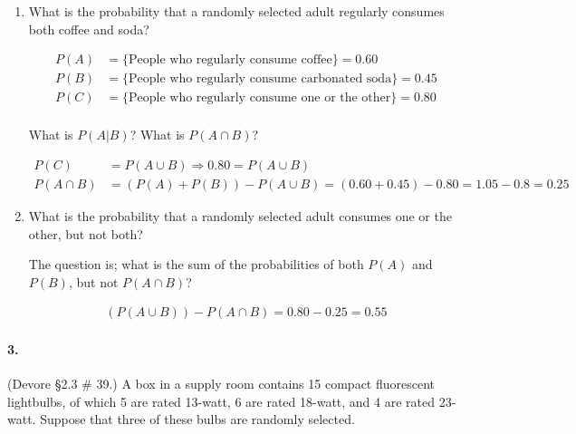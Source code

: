     \begin{enumerate}[label=(\alph*)]
        \item What is the probability that a randomly selected adult regularly consumes both coffee and soda?

        \begin{mdframed}
            \begin{align*}
                P(A) & = \{\text{People who regularly consume coffee}\} = 0.60 \\
                P(B) & = \{\text{People who regularly consume carbonated soda}\} = 0.45 \\
                P(C) & = \{\text{People who regularly consume one or the other}\} = 0.80 \\
            \end{align*}

            What is $P(A|B)$? What is $P(A \cap B)$?

            \begin{align*}
                P(C) & = P(A \cup B) \Rightarrow 0.80 = P(A \cup B)  \\
                P(A \cap B) & = (P(A) + P(B)) - P(A \cup B) = (0.60 + 0.45) - 0.80 = 1.05 - 0.8 = \boxed{0.25}
            \end{align*}
            
        \end{mdframed}

        \item What is the probability that a randomly selected adult consumes one or the
        other, but not both?

        \begin{mdframed}
            The question is; what is the sum of the probabilities of both $P(A)$ and $P(B)$, but not $P(A \cap B)$?

            \begin{align*}
                (P(A \cup B)) - P(A \cap B) = 0.80 - 0.25 = \boxed{0.55}
            \end{align*}
        \end{mdframed}
    \end{enumerate}

    \pagebreak

    \paragraph*{3.}
    (Devore \S 2.3 \# 39.) A box in a supply room contains 15 compact fluorescent lightbulbs, of which 5 are rated 13-watt, 6 are rated 18-watt, and 4 are rated 23-watt. Suppose that three of these bulbs are randomly selected.

